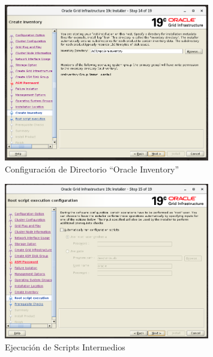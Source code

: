 \documentclass{article}
\begin{document}
\begin{figure}[H]
		\begin{center}
			\includegraphics[width=0.80\textwidth]{grid_install_14_create_inventory.png}
		\end{center}
		\caption{Configuración de Directorio ``Oracle Inventory''}
\end{figure}

\begin{figure}[H]
		\begin{center}
			\includegraphics[width=0.80\textwidth]{grid_install_15_root_script_execution.png}
		\end{center}
		\caption{Ejecución de Scripts Intermedios}
\end{figure}
\end{document}
